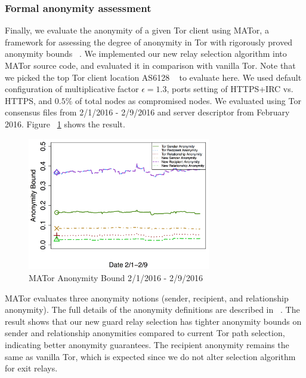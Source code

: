 \subsubsection{Formal anonymity assessment}
Finally, we evaluate the anonymity of a given Tor client using MATor, a framework for assessing the degree of anonymity in Tor with rigorously proved anonymity bounds ~\cite{backes2014nothing}. We implemented our new relay selection algorithm into MATor source code, and evaluated it in comparison with vanilla Tor. Note that we picked the top Tor client location AS6128 ~\cite{juen2012protecting} to evaluate here. We used default configuration of multiplicative factor $\epsilon=1.3$, ports setting of HTTPS+IRC vs. HTTPS, and $0.5\%$ of total nodes as compromised nodes. We evaluated using Tor consensus files from 2/1/2016 - 2/9/2016 and server descriptor from February 2016. Figure ~\ref{fig_mator} shows the result. 

\begin{figure}[ht!]
\centering
\includegraphics[width=80mm]{figure/mator}
\caption{MATor Anonymity Bound 2/1/2016 - 2/9/2016\label{fig_mator}}
\end{figure}

MATor evaluates three anonymity notions (sender, recipient, and relationship anonymity). The full details of the anonymity definitions are described in ~\cite{backes2014nothing}. The result shows that our new guard relay selection has tighter anonymity bounds on sender and relationship anonymities compared to current Tor path selection, indicating better anonymity guarantees. The recipient anonymity remains the same as vanilla Tor, which is expected since we do not alter selection algorithm for exit relays. 





